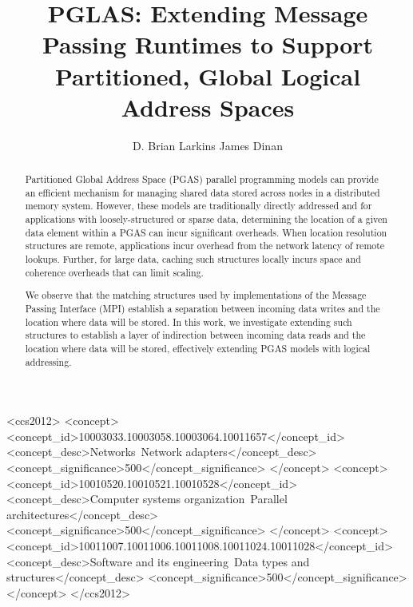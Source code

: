 \documentclass[prodmode]{acmsmall} %
\begin{document}

\title{PGLAS: Extending Message Passing Runtimes to Support Partitioned, Global Logical Address Spaces}
\author{D. Brian Larkins
James Dinan
}


\begin{abstract}

Partitioned Global Address Space (PGAS) parallel programming models can provide
an efficient mechanism for managing shared data stored across nodes in a
distributed memory system.  However, these models are traditionally directly
addressed and for applications with loosely-structured or sparse data,
determining the location of a given data element within a PGAS can incur
significant overheads.  When location resolution structures are remote,
applications incur overhead from the network latency of remote lookups.
Further, for large data, caching such structures locally incurs space and
coherence overheads that can limit scaling.

We observe that the matching structures used by implementations of the Message
Passing Interface (MPI) establish a separation between incoming data writes and
the location where data will be stored.  In this work, we investigate extending
such structures to establish a layer of indirection between incoming data reads
and the location where data will be stored, effectively extending PGAS models
with logical addressing.

\end{abstract}


%
%
\begin{CCSXML}
<ccs2012>
<concept>
<concept_id>10003033.10003058.10003064.10011657</concept_id>
<concept_desc>Networks~Network adapters</concept_desc>
<concept_significance>500</concept_significance>
</concept>
<concept>
<concept_id>10010520.10010521.10010528</concept_id>
<concept_desc>Computer systems organization~Parallel architectures</concept_desc>
<concept_significance>500</concept_significance>
</concept>
<concept>
<concept_id>10011007.10011006.10011008.10011024.10011028</concept_id>
<concept_desc>Software and its engineering~Data types and structures</concept_desc>
<concept_significance>500</concept_significance>
</concept>
</ccs2012>
\end{CCSXML}
\end{document}
